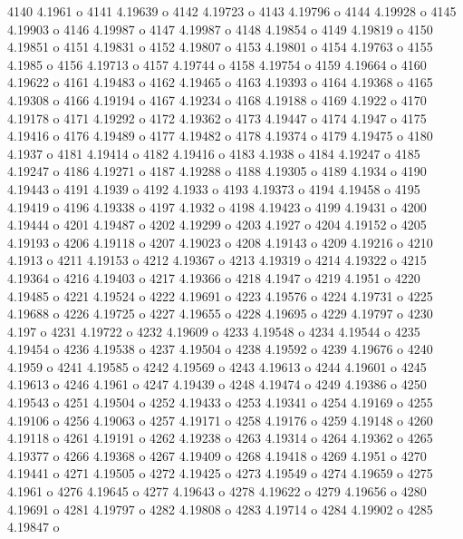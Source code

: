  4140  4.1961  o
 4141  4.19639  o
 4142  4.19723  o
 4143  4.19796  o
 4144  4.19928  o
 4145  4.19903  o
 4146  4.19987  o
 4147  4.19987  o
 4148  4.19854  o
 4149  4.19819  o
 4150  4.19851  o
 4151  4.19831  o
 4152  4.19807  o
 4153  4.19801  o
 4154  4.19763  o
 4155  4.1985  o
 4156  4.19713  o
 4157  4.19744  o
 4158  4.19754  o
 4159  4.19664  o
 4160  4.19622  o
 4161  4.19483  o
 4162  4.19465  o
 4163  4.19393  o
 4164  4.19368  o
 4165  4.19308  o
 4166  4.19194  o
 4167  4.19234  o
 4168  4.19188  o
 4169  4.1922  o
 4170  4.19178  o
 4171  4.19292  o
 4172  4.19362  o
 4173  4.19447  o
 4174  4.1947  o
 4175  4.19416  o
 4176  4.19489  o
 4177  4.19482  o
 4178  4.19374  o
 4179  4.19475  o
 4180  4.1937  o
 4181  4.19414  o
 4182  4.19416  o
 4183  4.1938  o
 4184  4.19247  o
 4185  4.19247  o
 4186  4.19271  o
 4187  4.19288  o
 4188  4.19305  o
 4189  4.1934  o
 4190  4.19443  o
 4191  4.1939  o
 4192  4.1933  o
 4193  4.19373  o
 4194  4.19458  o
 4195  4.19419  o
 4196  4.19338  o
 4197  4.1932  o
 4198  4.19423  o
 4199  4.19431  o
 4200  4.19444  o
 4201  4.19487  o
 4202  4.19299  o
 4203  4.1927  o
 4204  4.19152  o
 4205  4.19193  o
 4206  4.19118  o
 4207  4.19023  o
 4208  4.19143  o
 4209  4.19216  o
 4210  4.1913  o
 4211  4.19153  o
 4212  4.19367  o
 4213  4.19319  o
 4214  4.19322  o
 4215  4.19364  o
 4216  4.19403  o
 4217  4.19366  o
 4218  4.1947  o
 4219  4.1951  o
 4220  4.19485  o
 4221  4.19524  o
 4222  4.19691  o
 4223  4.19576  o
 4224  4.19731  o
 4225  4.19688  o
 4226  4.19725  o
 4227  4.19655  o
 4228  4.19695  o
 4229  4.19797  o
 4230  4.197  o
 4231  4.19722  o
 4232  4.19609  o
 4233  4.19548  o
 4234  4.19544  o
 4235  4.19454  o
 4236  4.19538  o
 4237  4.19504  o
 4238  4.19592  o
 4239  4.19676  o
 4240  4.1959  o
 4241  4.19585  o
 4242  4.19569  o
 4243  4.19613  o
 4244  4.19601  o
 4245  4.19613  o
 4246  4.1961  o
 4247  4.19439  o
 4248  4.19474  o
 4249  4.19386  o
 4250  4.19543  o
 4251  4.19504  o
 4252  4.19433  o
 4253  4.19341  o
 4254  4.19169  o
 4255  4.19106  o
 4256  4.19063  o
 4257  4.19171  o
 4258  4.19176  o
 4259  4.19148  o
 4260  4.19118  o
 4261  4.19191  o
 4262  4.19238  o
 4263  4.19314  o
 4264  4.19362  o
 4265  4.19377  o
 4266  4.19368  o
 4267  4.19409  o
 4268  4.19418  o
 4269  4.1951  o
 4270  4.19441  o
 4271  4.19505  o
 4272  4.19425  o
 4273  4.19549  o
 4274  4.19659  o
 4275  4.1961  o
 4276  4.19645  o
 4277  4.19643  o
 4278  4.19622  o
 4279  4.19656  o
 4280  4.19691  o
 4281  4.19797  o
 4282  4.19808  o
 4283  4.19714  o
 4284  4.19902  o
 4285  4.19847  o
